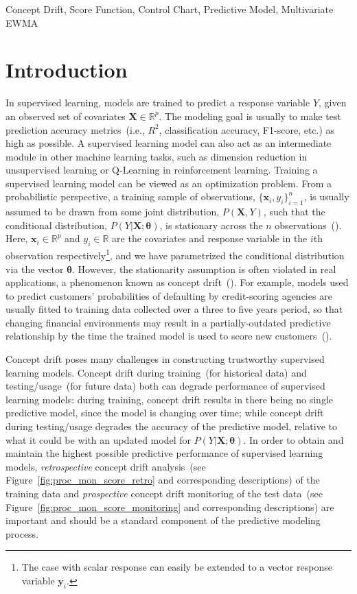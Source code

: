 \documentclass[twoside,11pt]{article}
\begin{document}
\begin{keywords} 	
  Concept Drift, Score Function, Control Chart, Predictive Model, Multivariate EWMA
\end{keywords}

\section{Introduction}
\label{s:intro}
In supervised learning, models are trained to predict a response variable $Y$, given an observed set of covariates $\bm{X} \in \mathbb{R}^p$. The modeling goal is usually to make test prediction accuracy metrics~(i.e., $R^2$, classification accuracy, F1-score, etc.) as high as possible. A supervised learning model can also act as an intermediate module in other machine learning tasks, such as dimension reduction in unsupervised learning or Q-Learning in reinforcement learning. Training a supervised learning model can be viewed as an optimization problem. From a probabilistic perspective, a training sample of observations, $\{\bm {x}_i, y_i\}_{i=1}^n$, is usually assumed to be drawn from some joint distribution, $P (\bm {X}, Y)$, such that the conditional distribution, $P(Y|\bm{X};\bm{\theta})$, is stationary across the $n$ observations~(\cite{hulten2001mining}). Here, {$\bm {x}_i \in \mathbb{R}^{p}$ and $y_i \in \mathbb{R}$ are the covariates and response variable in the $i$th observation respectively}\footnote{The case with scalar response can easily be extended to a vector response variable $\bm {y}_i$.}, and we have parametrized the conditional distribution via the vector $\bm{\theta}$. However, the stationarity assumption is often violated in real applications, a phenomenon known as concept drift~(\cite{moreno2012unifying,vzliobaite2016overview}). For example, models used to predict customers' probabilities of defaulting by credit-scoring agencies are usually fitted to training data collected over a three to five years period, so that changing financial environments may result in a partially-outdated predictive relationship by the time the trained model is used to score new customers~(\cite{crook1992degradation,vzliobaite2016overview}). 

Concept drift poses many challenges in constructing trustworthy supervised learning models. Concept drift during training~(for historical data) and testing/usage~(for future data) both can degrade performance of supervised learning models: during training, concept drift results in there being no single predictive model, since the model is changing over time; while concept drift during testing/usage degrades the accuracy of the predictive model, relative to what it could be with an updated model for $P(Y|\bm{X};\bm{\theta})$. In order to obtain and maintain the highest possible predictive performance of supervised learning models, \textit{retrospective} concept drift analysis~(see Figure~\ref{fig:proc_mon_score_retro} and corresponding descriptions) of the training data and \textit{prospective} concept drift monitoring of the test data~(see Figure~\ref{fig:proc_mon_score_monitoring} and corresponding descriptions) are important and should be a standard component of the predictive modeling process.
\end{document}
